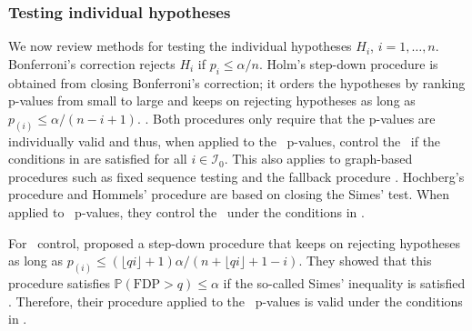 \documentclass[a4paper,11pt]{article}
\theoremstyle{plain}
\theoremstyle{definition}
\def\PP{\mathbb{P}}
\def\calI{\mathcal{I}}
\theoremstyle{plain}
\newcommand{\No}{{n}}
\newcommand{\pval}[1]{{p_{#1}}}
\newcommand{\testStatistics}[1]{{T_{#1}}}
\newcommand{\ncTestStatistics}[1]{{C_{#1}}}
\newcommand{\nickname}{{\text{RANC}}}
\newcommand{\hypothesis}[1]{{H_{#1}}}
\newcommand{\hypothesisIndex}[1]{{\calI_{#1}}}
\newcommand{\FWER}{\text{FWER}}
\newcommand{\FDP}{\text{FDP}}
\newcommand{\permutationFunction}[1]{{G(#1)}}
\begin{document}




\subsubsection{Testing individual hypotheses}\label{sec:individual.hypothesis}

We now review methods for testing the individual hypotheses
$\hypothesis{i}$, $i=1,\dotsc,\No$. Bonferroni's correction rejects
$\hypothesis{i}$ if $\pval{i} \leq \alpha / n$. Holm's step-down
procedure is obtained from closing Bonferroni's correction; it orders
the hypotheses by ranking p-values from small to large and %
keeps on rejecting hypotheses as long as $p_{(i)} \leq \alpha/(\No - i
+ 1)$.
\parencite{holm1979simple}. Both procedures only require that the p-values
are individually valid and thus, when applied to the
\nickname~p-values, control the \FWER~if the conditions in
 are satisfied for all $i \in
\hypothesisIndex{0}$. This also applies to graph-based procedures such
as fixed sequence testing and the fallback procedure
\parencite{wiens03_fixed_sequen_bonfer_proced_testin_multip_endpoin,bretz2009graphical}.
Hochberg's procedure
\parencite{hochberg88_sharp_bonfer_proced_multip_tests_signif} and
Hommels' procedure
\parencite{hommel88_stagew_rejec_multip_test_proced} are based on
closing the Simes' test. When applied to \nickname~p-values, they
control the \FWER~under the conditions in .

For \FDP~control,
\textcite{lehmann2005generalizations} proposed a step-down procedure
that keeps on rejecting hypotheses as long as $p_{(i)} \leq (\lfloor
q i \rfloor + 1)\alpha/(\No + \lfloor q i \rfloor + 1 - i)$. They
showed that this procedure satisfies $\PP(\FDP > q) \leq \alpha$ if
the so-called Simes' inequality is satisfied \parencite[thm.\
3.2]{lehmann2005generalizations}. Therefore, their procedure applied
to the \nickname~p-values is valid under the conditions in
.
\end{document}
